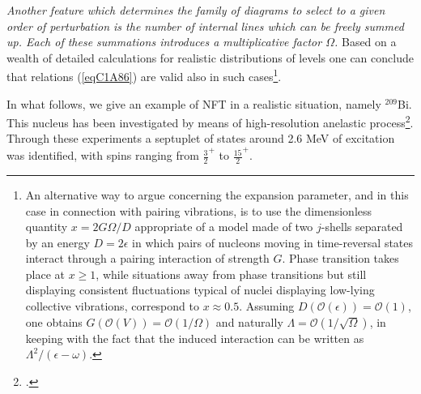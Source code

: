 \textit{Another feature which determines the family of diagrams to select to a given order of perturbation is the number of internal lines which can be freely summed up. Each of these summations introduces a multiplicative factor $\Omega$.} Based on a wealth of detailed calculations for realistic distributions of levels one can conclude that  relations (\ref{eqC1A86}) are valid also in such cases\footnote{\label{fn107}An alternative way to argue concerning the expansion parameter, and in this case in connection with pairing vibrations, is to use the dimensionless quantity $x=2G\Omega/D$ appropriate of a model made of two $j$-shells separated by an energy $D=2\epsilon$ in which pairs of nucleons moving in time-reversal states interact through a pairing interaction of strength $G$. Phase transition takes place at $x\geq1$, while situations away from phase transitions but still displaying consistent fluctuations typical of nuclei displaying low-lying collective vibrations, correspond to $x\approx0.5$. Assuming $D(\mathcal O(\epsilon))=\mathcal O(1)$, one obtains $G(\mathcal O(V))=\mathcal O(1/\Omega)$ and naturally $\Lambda=\mathcal O(1/\sqrt{\Omega})$, in keeping with the fact that the induced interaction can be written as $\Lambda^2/(\epsilon-\omega)$.}.


  In what follows, we give an example of NFT in a realistic situation, namely $^{209}$Bi. 
This nucleus has been investigated by means of high-resolution anelastic process\footnote{\cite{Ungrin:71}.}. Through these experiments a septuplet of states around 2.6 MeV of excitation was identified, with spins 
ranging from $\frac{3}{2}^+$ to $\frac{15}{2}^+$. 


